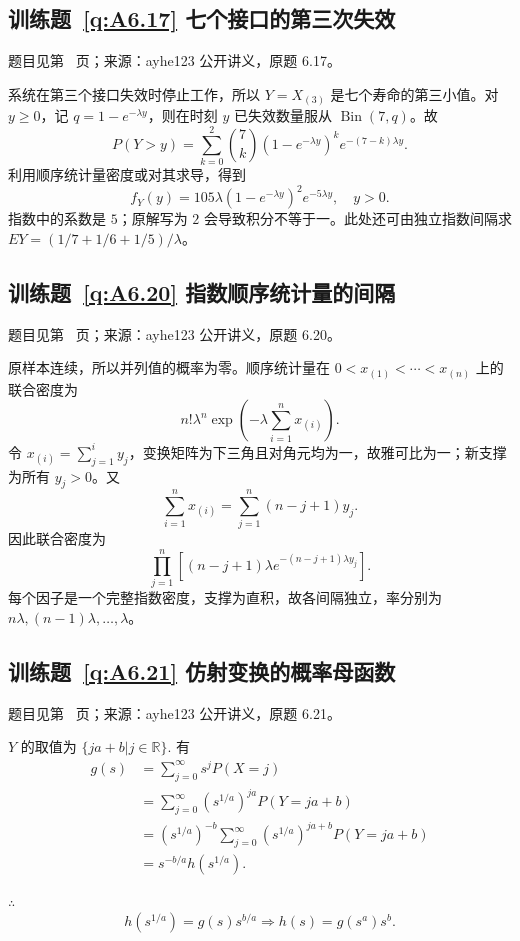 \subsection*{训练题~\ref{q:A6.17} 七个接口的第三次失效}\label{a:A6.17}{\small 题目见第~\pageref{q:A6.17} 页；来源：ayhe123 公开讲义，原题 6.17。}
\begin{solve}系统在第三个接口失效时停止工作，所以 $Y=X_{(3)}$ 是七个寿命的第三小值。对 $y\ge0$，记 $q=1-e^{-\lambda y}$，则在时刻 $y$ 已失效数量服从 $\operatorname{Bin}(7,q)$。故\[P(Y>y)=\sum_{k=0}^{2}\binom7k(1-e^{-\lambda y})^k e^{-(7-k)\lambda y}.\]利用顺序统计量密度或对其求导，得到\[f_Y(y)=105\lambda(1-e^{-\lambda y})^2e^{-5\lambda y},\quad y>0.\]指数中的系数是 $5$；原解写为 $2$ 会导致积分不等于一。此处还可由独立指数间隔求 $EY=(1/7+1/6+1/5)/\lambda$。\end{solve}

\subsection*{训练题~\ref{q:A6.20} 指数顺序统计量的间隔}\label{a:A6.20}{\small 题目见第~\pageref{q:A6.20} 页；来源：ayhe123 公开讲义，原题 6.20。}
\begin{solve}原样本连续，所以并列值的概率为零。顺序统计量在 $0<x_{(1)}<\cdots<x_{(n)}$ 上的联合密度为\[n!\lambda^n\exp\left(-\lambda\sum_{i=1}^nx_{(i)}\right).\]令 $x_{(i)}=\sum_{j=1}^iy_j$，变换矩阵为下三角且对角元均为一，故雅可比为一；新支撑为所有 $y_j>0$。又\[\sum_{i=1}^nx_{(i)}=\sum_{j=1}^n(n-j+1)y_j.\]因此联合密度为\[\prod_{j=1}^n\left[(n-j+1)\lambda e^{-(n-j+1)\lambda y_j}\right].\]每个因子是一个完整指数密度，支撑为直积，故各间隔独立，率分别为 $n\lambda,(n-1)\lambda,\ldots,\lambda$。\end{solve}

\subsection*{训练题~\ref{q:A6.21} 仿射变换的概率母函数}\label{a:A6.21}{\small 题目见第~\pageref{q:A6.21} 页；来源：ayhe123 公开讲义，原题 6.21。}
\begin{solve}
    $Y$ 的取值为 $\{ja+b|j\in\mathbb{R}\}$. 有
    \begin{align*}
        g(s) & =\sum\limits_{j=0}^\infty s^jP(X=j) \\
        & =\sum\limits_{j=0}^\infty(s^{1/a})^{ja}P(Y=ja+b) \\
        & =(s^{1/a})^{-b}\sum\limits_{j=0}^\infty(s^{1/a})^{ja+b}P(Y=ja+b) \\
        & =s^{-b/a}h(s^{1/a}).
    \end{align*}

    $\therefore$
    \[h(s^{1/a})=g(s)s^{b/a}\Rightarrow h(s)=g(s^a)s^b.\]
\end{solve}

